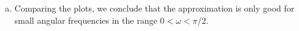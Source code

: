 \begin{enumerate}
\begin{enumerate}[a)]
          \item Comparing the plots, we conclude that the approximation is only good for 
                small angular frequencies in the range $0<\omega<\pi/2$.
        \end{enumerate}

\end{enumerate}



